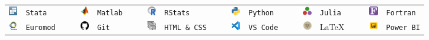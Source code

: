 %
%

\vspace{5 mm}


\vspace{2 mm}

\begin{tabular}{rlrrrlrrrlrrrlrrrlrrrl}
	\includegraphics[width=0.15in,height=0.15in]{icon/stata.jpg}  		&   \texttt{Stata}  	& & & \includegraphics[width=0.15in,height=0.15in]{icon/matlab.jpg}	 & \texttt{Matlab} & & & 
	\includegraphics[width=0.15in,height=0.15in]{icon/r.jpg} 					& 	\texttt{RStats} 				& & & \includegraphics[width=0.15in,height=0.15in]{icon/python.jpg}	 & \texttt{Python} & & &
	\includegraphics[width=0.15in,height=0.15in]{icon/julia.jpg}  		&   \texttt{Julia}  	& & & \includegraphics[width=0.15in,height=0.15in]{icon/fortran.jpg} & \texttt{Fortran} \\ 
	\includegraphics[width=0.15in,height=0.15in]{icon/euromod.jpg} 		& 	\texttt{Euromod}					 	& & & \includegraphics[width=0.15in,height=0.15in]{icon/github.jpg}	 & \texttt{Git} & & &
	\includegraphics[width=0.15in,height=0.15in]{icon/htmlcss.png} 				& 	\texttt{HTML \& CSS}					 	& & & \includegraphics[width=0.15in,height=0.15in]{icon/vscode.jpg}	 & \texttt{VS Code} & & &
	\includegraphics[width=0.15in,height=0.15in]{icon/tex.jpg} 				& 	\LaTeX					 	& & & \includegraphics[width=0.15in,height=0.15in]{icon/powerbi.png}	 & \texttt{Power BI} \\
	
	
\end{tabular}

